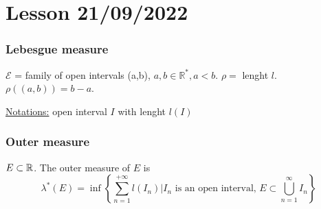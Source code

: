 \section{Lesson 21/09/2022}
\subsubsection*{Lebesgue measure}
\(\mathcal{E}\) = family of open intervals (a,b), \(a,b \in \mathbb{R}^*, a < b\). \(\rho =\) lenght \(l\).
\(\rho((a,b)) = b - a\). 

\underline{Notations:} open interval \(I\) with lenght \(l(I)\)
\subsubsection*{Outer measure}
\(E \subset \mathbb{R}\). The outer measure of \(E\) is 
\[
    \lambda^*(E) = \inf \left\lbrace \sum_{n=1}^{+\infty} l(I_n) \vert I_n \mbox{ is an open interval, } E \subset \bigcup_{n = 1}^{\infty} I_n \right\rbrace
\]
